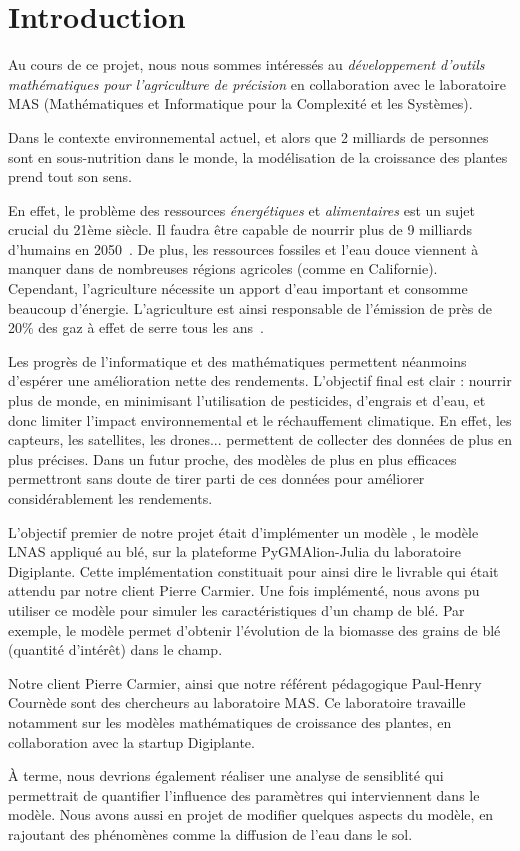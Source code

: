 \section{Introduction}


Au cours de ce projet, nous nous sommes intéressés au \emph{développement d'outils mathématiques 
pour l'agriculture de précision} en collaboration avec le laboratoire MAS (Mathématiques et Informatique pour la Complexité et les Systèmes).

Dans le contexte environnemental actuel, et alors que 2 milliards de personnes sont en sous-nutrition dans le monde, la modélisation de la croissance des plantes prend tout son sens.

En effet, le problème des ressources \textit{énergétiques} et \textit{alimentaires} est un sujet crucial du  21ème siècle.
Il faudra être capable de nourrir plus de 
9 milliards d'humains en 2050~\cite{wiki:popu_mondiale}.
De plus, les ressources fossiles et l'eau douce viennent à manquer dans de nombreuses régions agricoles (comme en Californie). Cependant, l'agriculture nécessite un apport d'eau important et consomme beaucoup d'énergie. L'agriculture est ainsi responsable de l'émission de près de 20\% des gaz à effet de serre tous les ans~\cite{GES}.

Les progrès de l'informatique et des mathématiques permettent néanmoins d'espérer une amélioration nette des rendements. L'objectif final est clair : nourrir plus de monde, en minimisant l'utilisation de pesticides, d'engrais et d'eau, et donc limiter l'impact environnemental et le réchauffement climatique. En effet, les capteurs, les satellites, les drones... permettent de collecter des données de plus en plus précises. Dans un futur proche, des modèles de plus en plus efficaces permettront sans doute de tirer parti de ces données pour améliorer considérablement les rendements.  

L'objectif premier de notre projet était d'implémenter un modèle , le modèle LNAS appliqué au blé, sur la plateforme PyGMAlion-Julia du laboratoire Digiplante. Cette implémentation constituait pour ainsi dire le livrable qui était attendu par notre client Pierre Carmier.
Une fois implémenté, nous avons pu utiliser ce modèle pour simuler les caractéristiques d'un champ de blé. Par exemple, le modèle permet d'obtenir l'évolution de la biomasse des grains de blé (quantité d'intérêt) dans le champ.

Notre client Pierre Carmier, ainsi que notre référent pédagogique Paul-Henry Cournède sont des chercheurs au laboratoire MAS.
Ce laboratoire travaille notamment sur les modèles mathématiques de
croissance des plantes, en collaboration avec la startup Digiplante.

À terme, nous devrions également réaliser une analyse de sensiblité qui permettrait de quantifier l'influence des paramètres qui interviennent dans le modèle. Nous avons aussi en projet de modifier quelques aspects du modèle, en rajoutant des phénomènes comme la diffusion de l'eau dans le sol.